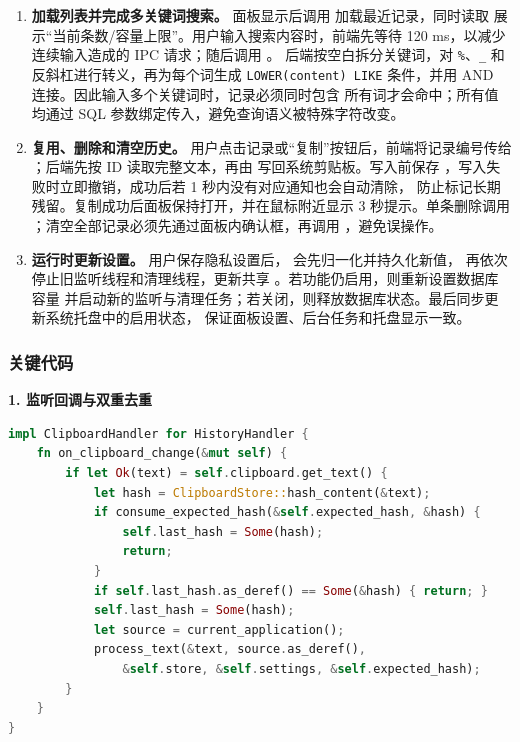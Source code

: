 \documentclass[12pt,a4paper]{ctexart}
\begin{document}
\begin{sloppypar}
\begin{enumerate}[label=(\arabic*)]
  \item \textbf{加载列表并完成多关键词搜索。}
    面板显示后调用  加载最近记录，同时读取
     展示“当前条数/容量上限”。用户输入搜索内容时，前端先等待
    120 ms，以减少连续输入造成的 IPC 请求；随后调用 。
    后端按空白拆分关键词，对 \texttt{\%}、\texttt{\_} 和反斜杠进行转义，再为每个词生成
    \texttt{LOWER(content) LIKE} 条件，并用 AND 连接。因此输入多个关键词时，记录必须同时包含
    所有词才会命中；所有值均通过 SQL 参数绑定传入，避免查询语义被特殊字符改变。

  \item \textbf{复用、删除和清空历史。}
    用户点击记录或“复制”按钮后，前端将记录编号传给 ；后端先按
    ID 读取完整文本，再由  写回系统剪贴板。写入前保存
    ，写入失败时立即撤销，成功后若 1 秒内没有对应通知也会自动清除，
    防止标记长期残留。复制成功后面板保持打开，并在鼠标附近显示 3 秒提示。单条删除调用
    ；清空全部记录必须先通过面板内确认框，再调用
    ，避免误操作。

  \item \textbf{运行时更新设置。}
    用户保存隐私设置后， 会先归一化并持久化新值，
    再依次停止旧监听线程和清理线程，更新共享 。若功能仍启用，则重新设置数据库容量
    并启动新的监听与清理任务；若关闭，则释放数据库状态。最后同步更新系统托盘中的启用状态，
    保证面板设置、后台任务和托盘显示一致。
\end{enumerate}
\end{sloppypar}

\subsubsection{关键代码}

\textbf{1. 监听回调与双重去重}

\begin{lstlisting}[language=Rust, caption=剪贴板变化监听]
impl ClipboardHandler for HistoryHandler {
    fn on_clipboard_change(&mut self) {
        if let Ok(text) = self.clipboard.get_text() {
            let hash = ClipboardStore::hash_content(&text);
            if consume_expected_hash(&self.expected_hash, &hash) {
                self.last_hash = Some(hash);
                return;
            }
            if self.last_hash.as_deref() == Some(&hash) { return; }
            self.last_hash = Some(hash);
            let source = current_application();
            process_text(&text, source.as_deref(),
                &self.store, &self.settings, &self.expected_hash);
        }
    }
}
\end{lstlisting}
\end{document}
